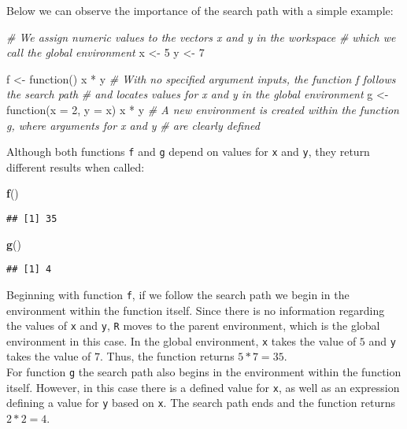 \documentclass[11,]{article}
\newenvironment{Shaded}{\begin{snugshade}}{\end{snugshade}}
\newcommand{\KeywordTok}[1]{\textcolor[rgb]{0.13,0.29,0.53}{\textbf{{#1}}}}
\newcommand{\DataTypeTok}[1]{\textcolor[rgb]{0.13,0.29,0.53}{{#1}}}
\newcommand{\DecValTok}[1]{\textcolor[rgb]{0.00,0.00,0.81}{{#1}}}
\newcommand{\StringTok}[1]{\textcolor[rgb]{0.31,0.60,0.02}{{#1}}}
\newcommand{\CommentTok}[1]{\textcolor[rgb]{0.56,0.35,0.01}{\textit{{#1}}}}
\newcommand{\NormalTok}[1]{{#1}}
\begin{document}
Below we can observe the importance of the search path with a simple
example:

\begin{Shaded}
\begin{Highlighting}[]
\CommentTok{# We assign numeric values to the vectors x and y in the workspace }
\CommentTok{# which we call the global environment}
\NormalTok{x <-}\StringTok{ }\DecValTok{5}
\NormalTok{y <-}\StringTok{ }\DecValTok{7}

\NormalTok{f <-}\StringTok{ }\NormalTok{function() x *}\StringTok{ }\NormalTok{y}
  \CommentTok{# With no specified argument inputs, the function f follows the search path}
  \CommentTok{# and locates values for x and y in the global environment}
\NormalTok{g <-}\StringTok{ }\NormalTok{function(}\DataTypeTok{x =} \DecValTok{2}\NormalTok{, }\DataTypeTok{y =} \NormalTok{x) x *}\StringTok{ }\NormalTok{y}
  \CommentTok{# A new environment is created within the function g, where arguments for x and y}
  \CommentTok{# are clearly defined}
\end{Highlighting}
\end{Shaded}

Although both functions \texttt{f} and \texttt{g} depend on values for
\texttt{x} and \texttt{y}, they return different results when called:

\begin{Shaded}
\begin{Highlighting}[]
\KeywordTok{f}\NormalTok{()}
\end{Highlighting}
\end{Shaded}

\begin{verbatim}
## [1] 35
\end{verbatim}

\begin{Shaded}
\begin{Highlighting}[]
\KeywordTok{g}\NormalTok{()}
\end{Highlighting}
\end{Shaded}

\begin{verbatim}
## [1] 4
\end{verbatim}

Beginning with function \texttt{f}, if we follow the search path we
begin in the environment within the function itself. Since there is no
information regarding the values of \texttt{x} and \texttt{y},
\texttt{R} moves to the parent environment, which is the global
environment in this case. In the global environment, \texttt{x} takes
the value of \(5\) and \texttt{y} takes the value of \(7\). Thus, the
function returns \(5*7=35\).\\
For function \texttt{g} the search path also begins in the environment
within the function itself. However, in this case there is a defined
value for \texttt{x}, as well as an expression defining a value for
\texttt{y} based on \texttt{x}. The search path ends and the function
returns \(2*2=4\).
\end{document}
